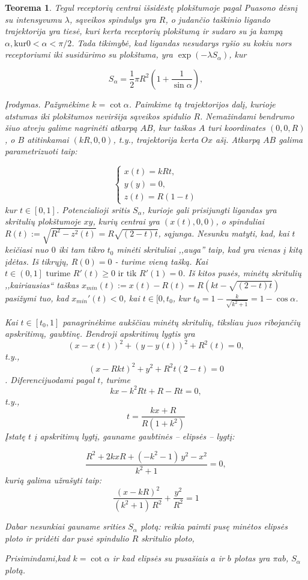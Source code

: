 \documentclass[10pt]{article}
\newtheorem{thm}{Teorema}
\begin{document}
\begin{thm}\label{thm:3}
Tegul receptorių centrai išsidėstę plokštumoje  pagal Puasono dėsnį su intensyvumu $\lambda$,  sąveikos spindulys yra $R$, o judančio taškinio ligando trajektorija yra  tiesė, kuri kerta receptorių plokštumą ir sudaro su ja kampą $\alpha, \mbox{kur} 0 < \alpha < \pi/2 $. Tada  tikimybė, kad ligandas nesudarys ryšio su kokiu nors receptoriumi  iki susidūrimo su plokštuma, yra $ \exp( -\lambda S_{\alpha}) $, kur 

\[
S_{\alpha} = \frac{1}{2} \pi R^2 \left(1 + \frac{1}{\sin \alpha } \right),
\]

Įrodymas. Pažymėkime $ k = \cot \alpha $. Paimkime tą trajektorijos dalį, kurioje atstumas iki plokštumos neviršija sąveikos spidulio  $ R $. Nemažindami bendrumo šiuo atveju galime nagrinėti atkarpą $ AB $, kur taškas $ A $ turi koordinates $ (0,0,R) $, o $ B $ atitinkamai  $ (kR,0,0) $, t.y., trajektorija kerta $ Ox $ ašį. Atkarpą  $ AB $ galima parametrizuoti taip:

\[
\begin{cases}
x(t) = kRt, \\
y(y) = 0, \\
z(t) = R(1-t)
\end{cases}
\]
kur $ t \in [0,1] $. Potencialioji sritis $ S_{\alpha} $, kurioje gali prisijungti ligandas yra skritulių plokštumoje $ xy $, kurių centrai yra $ (x(t),0,0)$, o spinduliai $ R(t):=\sqrt{R^2-z^2(t)}=R\sqrt{(2-t)t} $, sąjunga.
Nesunku matyti, kad, kai $ t $ keičiasi nuo $ 0 $ iki tam tikro $ t_0 $ minėti skrituliai ,,auga'' taip, kad yra vienas į kitą įdėtas. 
Iš tikrųjų, $ R(0)=0 $ - turime vieną tašką. Kai $ t \in \left( 0,1 \right] \mbox{ turime } R'(t) \geq 0 \mbox{ ir tik } R'(1)=0 $. Iš kitos pusės, minėtų skritulių ,,kairiausias`` taškas $ x_{min}(t) := x(t) - R(t) = R(kt-\sqrt{(2-t)t}) $ pasižymi tuo, kad $ x_{min}'(t) < 0 $, kai $ t \in [0, t_{0} $, kur 
$ t_{0} = 1 - \frac{k}{\sqrt{k^2+1}} = 1 - \cos \alpha  $.

Kai $ t \in [t_{0}, 1] $ panagrinėkime aukščiau minėtų skritulių, tiksliau juos ribojančių apskritimų, gaubtinę. Bendroji apskritimų lygtis yra
$$ (x-x(t))^2 + (y-y(t))^2 + R^2(t) = 0, $$ 
t.y.,
$$ (x-Rkt)^2 + y^2 + R^2t(2-t) = 0 $$. 
Diferencijuodami pagal $ t $, turime 
$$ kx-k^2Rt+R-Rt = 0,  $$
t.y.,
$$
	t=\frac{kx+R}{R(1+k^2)}
$$
Įstatę $ t $ į apskritimų lygtį, gauname  gaubtinės -- elipsės -- lygtį:

\[\frac{{R}^{2}+2kxR+\left( -{k}^{2}-1\right) \,{y}^{2}-{x}^{2}}{{k}^{2}+1}=0, \]
kurią galima užrašyti taip:
\[\frac{{\left( x-kR\right) }^{2}}{\left( {k}^{2}+1\right) \,{R}^{2}}+\frac{{y}^{2}}{{R}^{2}}=1\]


Dabar nesunkiai gauname srities $ S_{\alpha} $ plotą: reikia paimti pusę minėtos elipsės ploto ir pridėti dar  pusė spindulio $ R $ skritulio ploto, 

Prisimindami,kad $ k=\cot \alpha  $ ir kad elipsės su pusašiais $ a $ ir $ b $ plotas yra $ \pi a b $, $ S_{\alpha} $ plotą. 


\end{thm}
\end{document}
